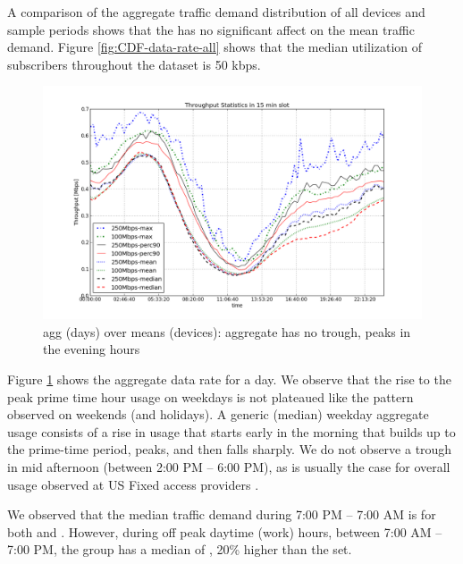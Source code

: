 A comparison of the aggregate traffic demand distribution of all devices and sample periods shows
that the \treatment{} has no significant affect on the mean traffic demand. Figure \ref{fig:CDF-data-rate-all}
shows that the median utilization of subscribers throughout the dataset is 50 kbps. 

\begin{figure}[ht]
\begin{minipage}{\linewidth}
  \centering
  \includegraphics[width=\linewidth]{figures/describe-total-throughput-per-day[replace].png}
  \caption{agg (days) over means (devices): aggregate has no trough, peaks in the evening hours}
  \label{fig:TS-data-rate-daily}
\end{minipage}
\end{figure}


Figure \ref{fig:TS-data-rate-daily} shows the aggregate data rate for a day. We observe that the rise to the peak prime time hour usage on weekdays is not plateaued like the pattern observed on weekends (and holidays).
A generic (median) weekday aggregate usage consists of a rise in usage that starts
early in the morning that builds up to the prime-time period, peaks, and then falls sharply.
We do not observe a trough in mid afternoon (between 2:00 PM -- 6:00 PM), as is usually
the case for overall usage observed at US Fixed access providers \cite{sandvine20141h}.

We observed that the median traffic demand during 7:00 PM -- 7:00 AM is  for
both \treatment{} and \control{}. However, during off peak daytime (work) hours, between
7:00 AM -- 7:00 PM, the \treatment{} group has a median of , 20\% higher than
the \control{} set.


